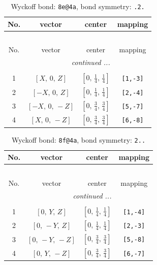 \documentclass[fleqn,8pt]{jsarticle}
\begin{document}
\renewcommand{\arraystretch}{1.2}
\begin{longtable}{cccc}
\caption{Wyckoff bond: {\tt 8e@4a}, bond symmetry: {\tt .2.}}
 \\
 \hline \hline
No. & vector & center & mapping \\ \hline \endfirsthead

\multicolumn{3}{l}{\tablename\ \thetable{}} \\
 \hline \hline
No. & vector & center & mapping \\ \hline \endhead

 \hline \hline
\multicolumn{3}{r}{\footnotesize\it continued ...} \\ \endfoot

 \hline \hline
\multicolumn{3}{r}{} \\ \endlastfoot

1 & $\left[ X,\, 0,\, Z \right]$ & $\left[ 0,\, \frac{1}{4},\, \frac{1}{4} \right]$ & {\tt [1,-3]} \\ \hline
2 & $\left[ - X,\, 0,\, Z \right]$ & $\left[ 0,\, \frac{1}{4},\, \frac{1}{4} \right]$ & {\tt [2,-4]} \\ \hline
3 & $\left[ - X,\, 0,\, - Z \right]$ & $\left[ 0,\, \frac{3}{4},\, \frac{3}{4} \right]$ & {\tt [5,-7]} \\ \hline
4 & $\left[ X,\, 0,\, - Z \right]$ & $\left[ 0,\, \frac{3}{4},\, \frac{3}{4} \right]$ & {\tt [6,-8]} \\
\end{longtable}
\renewcommand{\arraystretch}{1.2}
\begin{longtable}{cccc}
\caption{Wyckoff bond: {\tt 8f@4a}, bond symmetry: {\tt 2..}}
 \\
 \hline \hline
No. & vector & center & mapping \\ \hline \endfirsthead

\multicolumn{3}{l}{\tablename\ \thetable{}} \\
 \hline \hline
No. & vector & center & mapping \\ \hline \endhead

 \hline \hline
\multicolumn{3}{r}{\footnotesize\it continued ...} \\ \endfoot

 \hline \hline
\multicolumn{3}{r}{} \\ \endlastfoot

1 & $\left[ 0,\, Y,\, Z \right]$ & $\left[ 0,\, \frac{1}{4},\, \frac{1}{4} \right]$ & {\tt [1,-4]} \\ \hline
2 & $\left[ 0,\, - Y,\, Z \right]$ & $\left[ 0,\, \frac{1}{4},\, \frac{1}{4} \right]$ & {\tt [2,-3]} \\ \hline
3 & $\left[ 0,\, - Y,\, - Z \right]$ & $\left[ 0,\, \frac{3}{4},\, \frac{3}{4} \right]$ & {\tt [5,-8]} \\ \hline
4 & $\left[ 0,\, Y,\, - Z \right]$ & $\left[ 0,\, \frac{3}{4},\, \frac{3}{4} \right]$ & {\tt [6,-7]} \\
\end{longtable}
\end{document}
